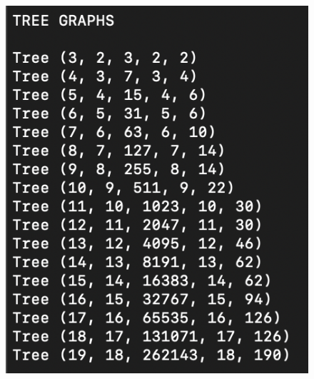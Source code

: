 \documentclass[12pt]{article}
\begin{document}
\begin{enumerate}
\begin{figure}
\begin{center}
\includegraphics[scale=0.6]{results3.png} 
\end{center}
\end{figure}


\end{enumerate}
\end{document}
